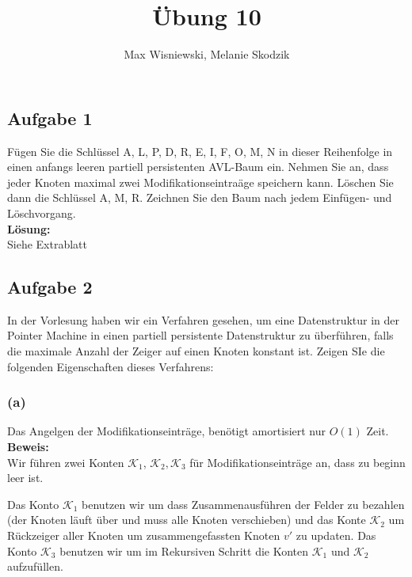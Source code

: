 \documentclass[11pt,a4paper,ngerman]{article}
\date{}
\title{Übung 10}
\author{Max Wisniewski, Melanie Skodzik}
\begin{document}

\renewcommand{\figurename}{Grafik}

\maketitle
\thispagestyle{fancy}


\subsection*{Aufgabe 1}
Fügen Sie die Schlüssel A, L, P, D, R, E, I, F, O, M, N in dieser Reihenfolge in einen anfangs leeren partiell persistenten AVL-Baum ein. Nehmen Sie an, dass jeder Knoten maximal zwei Modifikationseintraäge speichern kann. Löschen Sie dann die Schlüssel A, M, R. Zeichnen Sie den Baum nach jedem Einfügen- und Löschvorgang.\\

\noindent\textbf{Lösung:}\\
Siehe Extrablatt

\subsection*{Aufgabe 2}
In der Vorlesung haben wir ein Verfahren gesehen, um eine Datenstruktur in der Pointer Machine in einen partiell persistente Datenstruktur zu überführen, falls die maximale Anzahl der Zeiger auf einen Knoten konstant ist. Zeigen SIe die folgenden Eigenschaften dieses Verfahrens:

\subsubsection*{(a)}
Das Angelgen der Modifikationseinträge, benötigt amortisiert nur $O(1)$ Zeit.\\

\noindent\textbf{Beweis:}\\
Wir führen zwei Konten $\mathcal{K}_1$, $\mathcal{K}_2, \mathcal{K}_3$ für Modifikationseinträge an, dass zu beginn leer ist.

Das Konto $\mathcal{K}_1$ benutzen wir um dass Zusammenausführen der Felder zu bezahlen (der Knoten läuft über und muss alle Knoten verschieben) und das Konte $\mathcal{K}_2$ um Rückzeiger aller Knoten um zusammengefassten Knoten $v'$ zu updaten. Das Konto $\mathcal{K}_3$ benutzen
wir um im Rekursiven Schritt die Konten $\mathcal{K}_1$ und $\mathcal{K}_2$ aufzufüllen.
\end{document}

